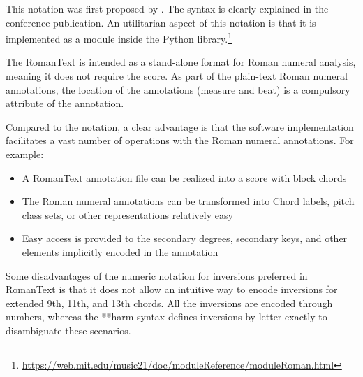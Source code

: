 This notation was first proposed by
\textcite{gotham2019romantext}. The syntax is clearly
explained in the conference publication. An utilitarian
aspect of this notation is that it is implemented as a
module inside the  Python
library.\footnote{\href{https://web.mit.edu/music21/doc/moduleReference/moduleRoman.html}{https://web.mit.edu/music21/doc/moduleReference/moduleRoman.html}}


The RomanText is intended as a stand-alone format for Roman
numeral analysis, meaning it does not require the score. As
part of the plain-text Roman numeral annotations, the
location of the annotations (measure and beat) is a
compulsory attribute of the annotation.

Compared to the  notation, a clear advantage is
that the software implementation facilitates a vast number
of operations with the Roman numeral annotations. For
example:

\begin{itemize}
    \item A RomanText annotation file can be realized into a
    score with block chords
    \item The Roman numeral annotations can be transformed
    into Chord labels, pitch class sets, or other
    representations relatively easy
    \item Easy access is provided to the secondary degrees,
    secondary keys, and other elements implicitly encoded in
    the annotation
\end{itemize}

Some disadvantages of the numeric notation for inversions
preferred in RomanText is that it does not allow an
intuitive way to encode inversions for extended 9th, 11th,
and 13th chords. All the inversions are encoded through
numbers, whereas the **harm syntax defines inversions by
letter exactly to disambiguate these scenarios.
